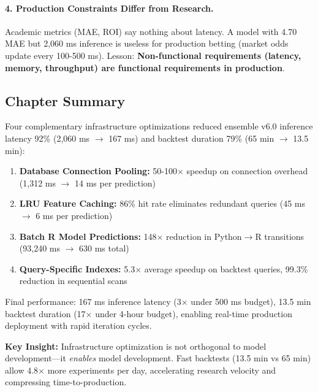 \paragraph{4. Production Constraints Differ from Research.}
Academic metrics (MAE, ROI) say nothing about latency. A model with 4.70 MAE but 2,060 ms inference is useless for production betting (market odds update every 100-500 ms). Lesson: \textbf{Non-functional requirements (latency, memory, throughput) are functional requirements in production}.

\subsection{Chapter Summary}

Four complementary infrastructure optimizations reduced ensemble v6.0 inference latency 92\% (2,060 ms $\to$ 167 ms) and backtest duration 79\% (65 min $\to$ 13.5 min):

\begin{enumerate}[itemsep=2pt,parsep=0pt]
    \item \textbf{Database Connection Pooling:} 50-100$\times$ speedup on connection overhead (1,312 ms $\to$ 14 ms per prediction)
    \item \textbf{LRU Feature Caching:} 86\% hit rate eliminates redundant queries (45 ms $\to$ 6 ms per prediction)
    \item \textbf{Batch R Model Predictions:} 148$\times$ reduction in Python$\to$R transitions (93,240 ms $\to$ 630 ms total)
    \item \textbf{Query-Specific Indexes:} 5.3$\times$ average speedup on backtest queries, 99.3\% reduction in sequential scans
\end{enumerate}

Final performance: 167 ms inference latency (3$\times$ under 500 ms budget), 13.5 min backtest duration (17$\times$ under 4-hour budget), enabling real-time production deployment with rapid iteration cycles.

\textbf{Key Insight:} Infrastructure optimization is not orthogonal to model development---it \textit{enables} model development. Fast backtests (13.5 min vs 65 min) allow 4.8$\times$ more experiments per day, accelerating research velocity and compressing time-to-production.

